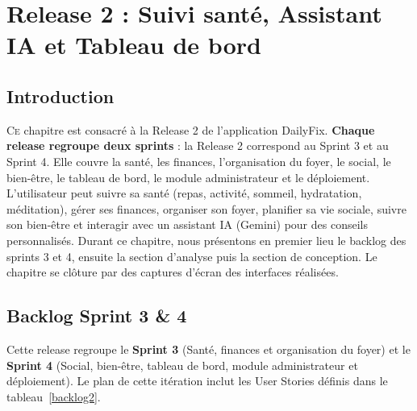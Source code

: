 
\chapter{Release 2 : Suivi santé, Assistant IA et Tableau de bord}
\minitoc

\renewcommand{\headrulewidth}{1pt}
\fancyhead[C]{} 
\fancyhead[L]{\leftmark}
\fancyhead[R]{}

\renewcommand{\footrulewidth}{1pt}
\fancyfoot[L]{}
\fancyfoot[C]{\thepage}
\fancyfoot[R]{}

\newpage

\section{Introduction}

\lettrine[lines=2]{C}e chapitre est consacré à la Release 2 de l'application DailyFix. \textbf{Chaque release regroupe deux sprints} : la Release 2 correspond au Sprint 3 et au Sprint 4. Elle couvre la santé, les finances, l'organisation du foyer, le social, le bien-être, le tableau de bord, le module administrateur et le déploiement. L'utilisateur peut suivre sa santé (repas, activité, sommeil, hydratation, méditation), gérer ses finances, organiser son foyer, planifier sa vie sociale, suivre son bien-être et interagir avec un assistant IA (Gemini) pour des conseils personnalisés. Durant ce chapitre, nous présentons en premier lieu le backlog des sprints 3 et 4, ensuite la section d'analyse puis la section de conception. Le chapitre se clôture par des captures d'écran des interfaces réalisées.

\section{Backlog Sprint 3 \& 4}

Cette release regroupe le \textbf{Sprint 3} (Santé, finances et organisation du foyer) et le \textbf{Sprint 4} (Social, bien-être, tableau de bord, module administrateur et déploiement). Le plan de cette itération inclut les User Stories définis dans le tableau~\ref{backlog2}.

